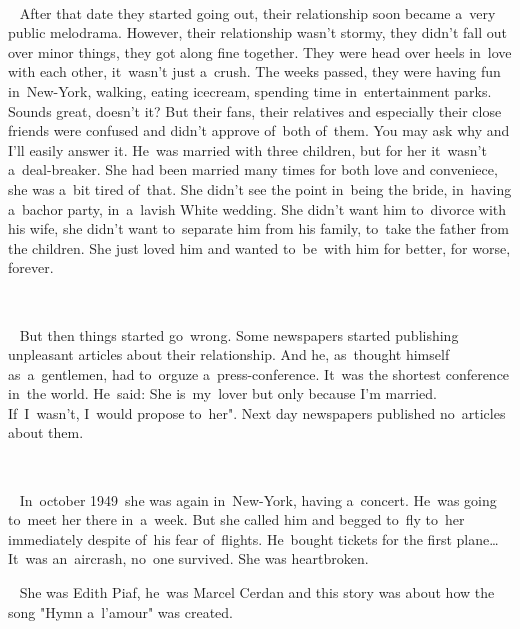 ~

~
After that date they started going out, their relationship soon became a~very public melodrama.
However, their relationship wasn't stormy, they didn't fall out over minor things, they got along fine together.
They were head over heels in~love with each other, it~wasn't just a~crush.
The weeks passed, they were having fun in~New-York, walking, eating icecream, spending time in~entertainment parks.
Sounds great, doesn't it? But their fans, their relatives and especially their close friends were confused and didn't approve of~both of~them.
You may ask why and I'll easily answer it.
He~was married with three children, but for her it~wasn't a~deal-breaker.
She had been married many times for both love and conveniece, she was a~bit tired of~that.
She didn't see the point in~being the bride, in~having a~bachor party, in~a~lavish White wedding.
She didn't want him to~divorce with his wife, she didn't want to~separate him from his family, to~take the father from the children.
She just loved him and wanted to~be~with him for better, for worse, forever.

~

~
But then things started go~wrong.
Some newspapers started publishing unpleasant articles about their relationship.
And he, as~thought himself as~a~gentlemen, had to~orguze a~press-conference.
It~was the shortest conference in~the world.
He~said: She is~my~lover but only because I'm married.
If~I~wasn't, I~would propose to~her".
Next day newspapers published no~articles about them.

~

~
In~october 1949~she was again in~New-York, having a~concert.
He~was going to~meet her there in~a~week.
But she called him and begged to~fly to~her immediately despite of~his fear of~flights.
He~bought tickets for the first plane… It~was an~aircrash, no~one survived.
She was heartbroken.

~
She was Edith Piaf, he~was Marcel Cerdan and this story was about how the song "Hymn a~l'amour" was created.
~
